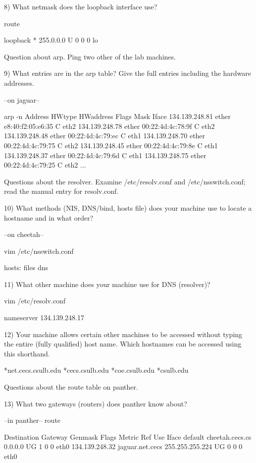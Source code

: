 8) What netmask does the loopback interface use?

route

loopback        *               255.0.0.0       U     0      0        0 lo

Question about arp.  Ping two other of the lab machines. 

9) What entries are in the arp table?
Give the full entries including the hardware addresses.

--on jaguar--

arp -n
Address                  HWtype  HWaddress           Flags Mask	Iface
134.139.248.81           ether   e8:40:f2:05:e6:35   C		eth2
134.139.248.78           ether   00:22:4d:4c:78:9f   C		eth2
134.139.248.48           ether   00:22:4d:4c:79:ec   C		eth1
134.139.248.70           ether   00:22:4d:4c:79:75   C		eth2
134.139.248.45           ether   00:22:4d:4c:79:8e   C		eth1
134.139.248.37           ether   00:22:4d:4c:79:6d   C		eth1
134.139.248.75           ether   00:22:4d:4c:79:25   C		eth2
...


Questions about the resolver. 
Examine {\ltt{}/etc/resolv.conf} and {\ltt{}/etc/nsswitch.conf};
 read the manual entry for {\ltt{}resolv.conf}.

10) What methods (NIS, DNS/bind, hosts file) does your machine use
to locate a hostname and in what order?

--on cheetah--

vim /etc/nsswitch.conf

hosts: files dns

11) What other machine does your machine use for DNS (resolver)?

vim /etc/resolv.conf

nameserver 134.139.248.17

12) Your machine allows certain other machines to be accessed without
typing the entire (fully qualified) host name. Which hostnames can
be accessed using this shorthand.

*net.cecs.csulb.edu
*cecs.csulb.edu
*coe.csulb.edu
*csulb.edu

Questions about the route table on {\ltt{}panther}.

13) What two gateways (routers) does {\ltt{}panther} know about?

--in panther--
route

Destination     Gateway         Genmask         Flags Metric Ref    Use Iface
default         cheetah.cecs.cs 0.0.0.0         UG    1      0        0 eth0
134.139.248.32  jaguar.net.cecs 255.255.255.224 UG    0      0        0 eth0



